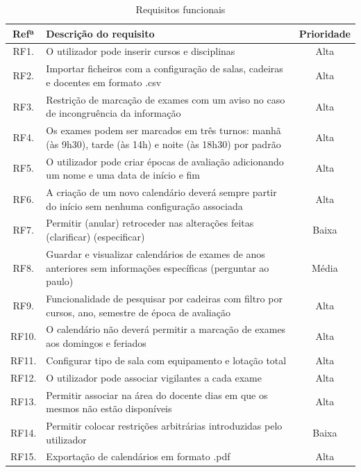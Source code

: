 \documentclass[11pt, twoside]{report}
\begin{document}
\begin{table}[H]
	\caption{Requisitos funcionais}
	\begin{center}	
				\begin{tabularx}{\textwidth}{|c|X|c|}
				\hline
				\textbf{Refª }	& \textbf{Descrição do requisito} & \textbf{Prioridade} \\
				\hline
				RF1. & O utilizador pode inserir cursos e disciplinas & Alta\\
				\hline
				RF2. & Importar ficheiros com a configuração de salas, cadeiras e docentes em formato .csv & Alta \\
				\hline
				RF3. &  Restrição de marcação de exames com um aviso no caso de incongruência da informação & Alta \\
				\hline
				RF4. & Os exames podem ser marcados em três turnos: manhã (às 9h30), tarde (às 14h) e noite (às 18h30) por padrão & Alta \\
				\hline
				RF5. & O utilizador pode criar épocas de avaliação adicionando um nome e uma data de início e fim & Alta \\
				\hline
				RF6. & A criação de um novo calendário deverá sempre partir do início sem nenhuma configuração associada & Alta\\
				\hline
				RF7. & Permitir (anular) retroceder nas alterações feitas (clarificar) (especificar) & Baixa \\
				\hline
				RF8. & Guardar e visualizar calendários de exames de anos anteriores sem informações específicas (perguntar ao paulo) & Média \\
				\hline
				RF9.  & Funcionalidade de pesquisar por cadeiras com filtro por cursos, ano, semestre de época de avaliação  & Alta \\
				\hline
				RF10. & O calendário não deverá permitir a marcação de exames aos domingos e feriados & Alta \\
				\hline
				RF11. & Configurar tipo de sala com equipamento e lotação total & Alta \\
				\hline
				RF12. & O utilizador pode associar vigilantes a cada exame & Alta \\
				\hline
				RF13. & Permitir associar na área do docente dias em que os mesmos não estão disponíveis & Alta\\
				\hline
				RF14. & Permitir colocar restrições arbitrárias introduzidas pelo utilizador & Baixa \\
				\hline
				RF15. & Exportação de calendários em formato .pdf & Alta \\

\end{tabularx}
\end{center}
\end{table}
\end{document}
